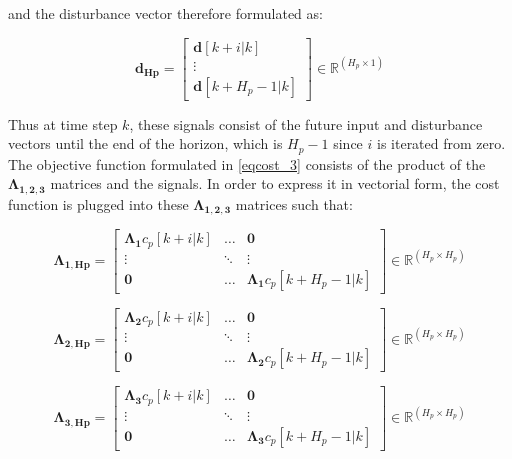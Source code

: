 and the disturbance vector therefore formulated as:

\begin{equation}
\bm{d_{Hp}} =  
 \begin{bmatrix}
  \bm{d}[k+i|k]\\
  \vdots  \\
  \bm{d}[k+H_p-1|k]   
 \end{bmatrix}
 \in \pmb{\mathbb{R}}^{(H_p \times 1)}
\end{equation}

Thus at time step $k$, these signals consist of the future input and disturbance vectors until the end of the horizon, which is $H_p - 1$ since $i$ is iterated from zero. 
\\
\newline
The objective function formulated in \eqref{eqcost_3} consists of the product of the $\bm{\Lambda_{1,2,3}}$ matrices and the signals. In order to express it in vectorial form, the cost function is plugged into these $\bm{\Lambda_{1,2,3}}$ matrices such that:

\begin{equation}
\bm{\Lambda_{1,Hp}} =
 \begin{bmatrix}
 \bm{\Lambda_1} c_p[k+i|k] & \hdots & \bm{0} \\
 \vdots & \ddots & \vdots\\
 \bm{0} & \hdots & \bm{\Lambda_1} c_p[k+H_p-1|k] 
 \end{bmatrix}
 \in \pmb{\mathbb{R}}^{(H_p \times H_p)}
\end{equation} 


\begin{equation}
\bm{\Lambda_{2,Hp}} =
 \begin{bmatrix}
 \bm{\Lambda_2} c_p[k+i|k] & \hdots & \bm{0} \\
 \vdots & \ddots & \vdots\\
 \bm{0} & \hdots & \bm{\Lambda_2} c_p[k+H_p-1|k] 
 \end{bmatrix}
 \in \pmb{\mathbb{R}}^{(H_p \times H_p)}
\end{equation} 


\begin{equation}
\bm{\Lambda_{3,Hp}} =
 \begin{bmatrix}
 \bm{\Lambda_3} c_p[k+i|k] & \hdots & \bm{0} \\
 \vdots & \ddots & \vdots\\
 \bm{0} & \hdots & \bm{\Lambda_3} c_p[k+H_p-1|k] 
 \end{bmatrix}
 \in \pmb{\mathbb{R}}^{(H_p \times H_p)}
\end{equation} 

